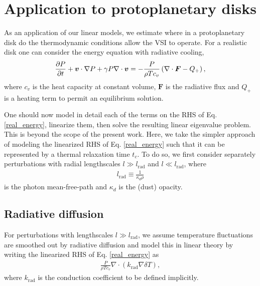 \section{Application to protoplanetary disks}\label{application} 
As an application of our linear models, we estimate where in a
protoplanetary disk do the thermodynamic conditions allow the VSI to
operate. For a realistic disk one can consider the energy equation
with radiative cooling, 
\begin{align}\label{real_energy}
  \frac{\partial P}{\partial t} + \bm{v}\cdot\nabla P +\gamma P \nabla\cdot\bm{v} = - \frac{P}{\rho T
    c_v}\left(\nabla\cdot\bm{F} - Q_+\right), 
\end{align}
where $c_v$ is the heat capacity at constant
volume, 
$\bm{F}$ is the radiative flux and $Q_+$ is a heating
term to permit an equilibrium solution. 

One should now model in detail each of the terms on the RHS of
Eq. \ref{real_energy}, linearize them, then solve 
the resulting linear eigenvalue problem. This is beyond 
the scope of the present work. Here, we take the simpler approach of
modeling the linearized RHS of Eq. \ref{real_energy} such that it can 
be represented by a thermal relaxation time $t_c$. 
To do so, we first consider separately perturbations
with radial lengthscales $l\gg l_\mathrm{rad}$ and  
$l\ll l_\mathrm{rad}$, where      
\begin{align}\label{lrad}
  l_\mathrm{rad} \equiv \frac{1}{\kappa_d\rho} 
\end{align} 
is the photon mean-free-path and $\kappa_d$ is the (dust) opacity. 

\subsection{Radiative diffusion}
For perturbations with lengthscales $l\gg
l_\mathrm{rad}$, we assume temperature fluctuations are smoothed out
by radiative diffusion and model this in linear theory by writing the
linearized RHS of Eq. \ref{real_energy} as 
\begin{align}\label{diff_cool_proper}
  \frac{P}{\rho T c_v} \nabla\cdot\left(k_\mathrm{rad}\nabla\delta
    T\right),  
\end{align}
where $k_\mathrm{rad}$ is the conduction coefficient to be defined
implicitly. 

